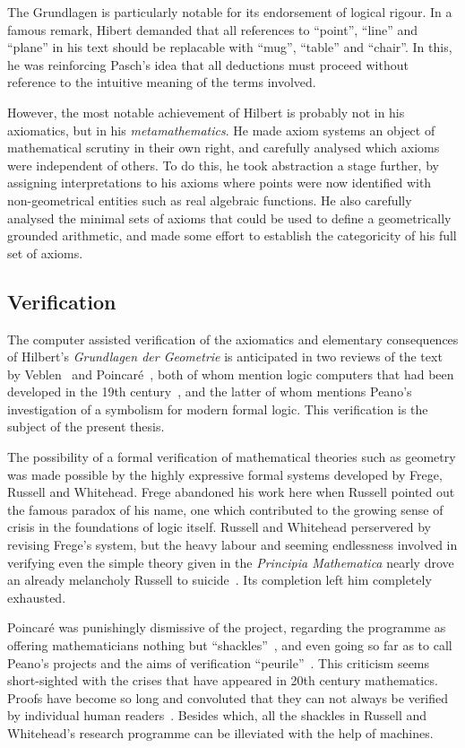 The Grundlagen is particularly notable for its endorsement of logical rigour. In a famous remark, Hibert demanded that all references to ``point'', ``line'' and ``plane'' in his text should be replacable with ``mug'', ``table'' and ``chair''. In this, he was reinforcing Pasch's idea that all deductions must proceed without reference to the intuitive meaning of the terms involved. 

However, the most notable achievement of Hilbert is probably not in his axiomatics, but in his \emph{metamathematics}. He made axiom systems an object of mathematical scrutiny in their own right, and carefully analysed which axioms were independent of others. To do this, he took abstraction a stage further, by assigning interpretations to his axioms where points were now identified with non-geometrical entities such as real algebraic functions. He also carefully analysed the minimal sets of axioms that could be used to define a geometrically grounded arithmetic, and made some effort to establish the categoricity of his full set of axioms.

\subsection{Verification}
The computer assisted verification of the axiomatics and elementary consequences of Hilbert's \emph{Grundlagen der Geometrie} is anticipated in two reviews of the text by Veblen~\cite{VeblenHilbertReview} and Poincar\'{e}~\cite{PoincareReview}, both of whom mention logic computers that had been developed in the 19th century~\cite{LogicMachines}, and the latter of whom mentions Peano's investigation of a symbolism for modern formal logic. This verification is the subject of the present thesis.

The possibility of a formal verification of mathematical theories such as geometry was made possible by the highly expressive formal systems developed by Frege, Russell and Whitehead. Frege abandoned his work here when Russell pointed out the famous paradox of his name, one which contributed to the growing sense of crisis in the foundations of logic itself. Russell and Whitehead perservered by revising Frege's system, but the heavy labour and seeming endlessness involved in verifying even the simple theory given in the \emph{Principia Mathematica} nearly drove an already melancholy Russell to suicide~\cite{RussellSuicide}. Its completion left him completely exhausted.

Poincar\'{e} was punishingly dismissive of the project, regarding the programme as offering mathematicians nothing but ``shackles''~\cite{PoincareShackles}, and even going so far as to call Peano's projects and the aims of verification ``peurile''~\cite{PoincareReview}. This criticism seems short-sighted with the crises that have appeared in 20th century mathematics. Proofs have become so long and convoluted that they can not always be verified by individual human readers~\cite{WhitherMathematics}. Besides which, all the shackles in Russell and Whitehead's research programme can be illeviated with the help of machines.

